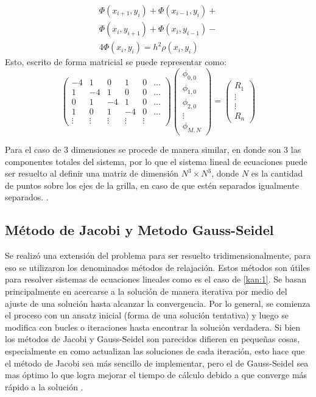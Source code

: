 \documentclass[reprint,amsmath,amssymb,aps]{revtex4-1}
\begin{document}
\begin{equation}
\begin{split}
    \Phi(x_{i+1},y_i)  + \Phi(x_{i-1},y_i) +\\ \Phi(x_i,y_{i+1})  + \Phi(x_i,y_{i-1}) - \\ 4\Phi(x_i,y_i) =  h^2 \rho (x_i,y_i)
\end{split}
\end{equation}
Esto, escrito de forma matricial se puede representar como:
\begin{equation}\label{matriz}
\begin{pmatrix}
-4 & 1 & 0 & 1 & 0 & \dots \\ 
1 & -4 & 1 & 0 & 0 & \dots \\
0 & 1 & -4 & 1 & 0 & \dots \\
1 & 0 & 1 & -4 & 0 & \dots \\
\vdots & \vdots & \vdots & \vdots & \vdots & 
\end{pmatrix}
\begin{pmatrix}
\phi_{0,0}\\ \phi_{1,0} \\ \phi_{2,0} \\ \vdots \\ \phi_{M,N}
\end{pmatrix}=
\begin{pmatrix}
R_1 \\
\vdots\\
\vdots\\
R_n
\end{pmatrix}
\end{equation}

Para el caso de 3 dimensiones se procede de manera similar, en donde son 3 las componentes totales del sistema, por lo que el sistema lineal de ecuaciones puede ser resuelto al definir una matriz de dimensión $N^3 \times N^3$, donde $N$ es la cantidad de puntos sobre los ejes de la grilla, en caso de que estén separados igualmente separados. \cite{Seidel}.


\subsection{Método de Jacobi y Metodo Gauss-Seidel}

Se realizó una extensión del problema para ser resuelto tridimensionalmente, para eso se utilizaron los denominados métodos de relajación. Estos métodos son útiles para resolver sistemas de ecuaciones lineales como es el caso de \ref{kan:1}. Se basan principalmente en acercarse a la solución de manera iterativa por medio del ajuste de una solución hasta alcanzar la convergencia. Por lo general, se comienza el proceso con un ansatz inicial (forma de una solución tentativa) y luego se modifica con bucles o iteraciones hasta encontrar la solución verdadera.
Si bien los métodos de Jacobi y Gauss-Seidel son parecidos difieren en pequeñas cosas, especialmente en como actualizan las soluciones de cada iteración, esto hace que el método de Jacobi sea más sencillo de implementar, pero el de Gauss-Seidel sea mas óptimo lo que logra mejorar el tiempo de cálculo debido a que converge más rápido a la solución \cite{poissonGauss, jacobi}.
\end{document}
